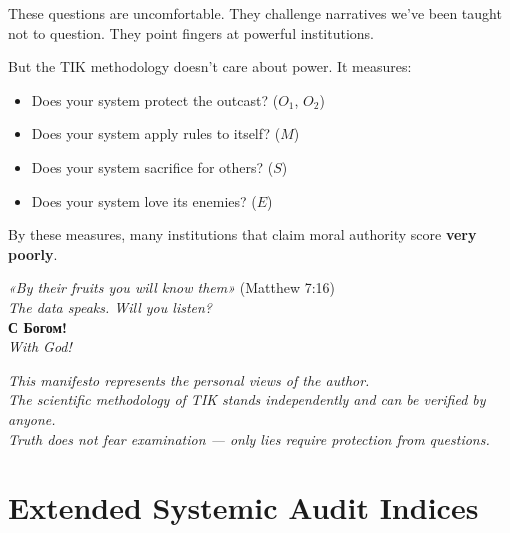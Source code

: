 \documentclass[11pt,a4paper]{article}
\theoremstyle{definition}
\theoremstyle{remark}
\begin{document}
These questions are uncomfortable. They challenge narratives we've been taught not to question. They point fingers at powerful institutions.

But the TIK methodology doesn't care about power. It measures:

\begin{itemize}
\item Does your system protect the outcast? ($O_1$, $O_2$)
\item Does your system apply rules to itself? ($M$)
\item Does your system sacrifice for others? ($S$)
\item Does your system love its enemies? ($E$)
\end{itemize}

By these measures, many institutions that claim moral authority score \textbf{very poorly}.

\vspace{1em}

\begin{center}
\textit{«By their fruits you will know them»} (Matthew 7:16)\\[1em]
\textit{The data speaks. Will you listen?}\\[2em]
\textbf{С Богом!}\\[0.5em]
\textit{With God!}
\end{center}

\vspace{2em}

\begin{center}
\small
\textit{This manifesto represents the personal views of the author.\\
The scientific methodology of TIK stands independently and can be verified by anyone.\\
Truth does not fear examination — only lies require protection from questions.}
\end{center}



\section{Extended Systemic Audit Indices}
\label{app:systemic_indices}
\end{document}
